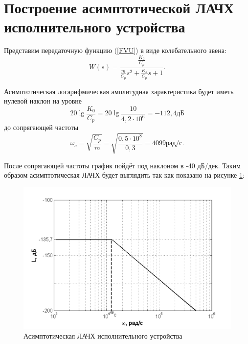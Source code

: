 \documentclass[a4paper,12pt]{article} %
\begin{document}
\newpage
\section{Построение асимптотической ЛАЧХ исполнительного устройства}
Представим передаточную функцию (\ref{FVU}) в виде колебательного звена:
\begin{equation} 
    W(s) = \frac{\displaystyle{\frac{K_0}{C_p}}}{\displaystyle{\frac{m}{C_p}}s^2 + \frac{K_d}{C_p}s + 1}.
\end{equation}

Асимптотическая логарифмическая амплитудная характеристика будет иметь нулевой наклон на уровне 
\begin{equation} 
   20\lg\displaystyle{\frac{K_0}{C_p}} = 20\lg \displaystyle{\frac{10}{4,2\cdot10^6}} = -112,4 \text{дБ}
\end{equation}
до сопрягающей частоты 
\begin{equation} 
	\omega_c = \sqrt{\displaystyle{\frac{C_p}{m}}} = \sqrt{\displaystyle{\frac{0,5\cdot10^8}{0,3}}} = 4099 \text{рад/с}.
\end{equation}
\par
После сопрягающей частоты график пойдёт под наклоном в -40 дБ/дек. Таким образом асимптотическая ЛАЧХ будет выглядить так как показано на рисунке \ref{L}:
\begin{figure}[H]
	\centering
	\includegraphics[width = \textwidth]{scheme/L}
	\caption{Асимптотическая ЛАЧХ исполнительного устройства}
	\label{L}
\end{figure}
\end{document}
